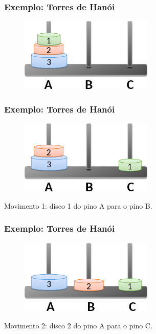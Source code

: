 \documentclass[aspectratio=169]{beamer}
\begin{document}
\begin{frame}
\frametitle{Exemplo: Torres de Hanói}

\begin{figure}[!h]
  \centering
  \includegraphics[width=180pt]{imgs/exemplo_torre_hanoi1.png}
  \label{fig_torre_hanoi2}
\end{figure}
\end{frame}


\begin{frame}
\frametitle{Exemplo: Torres de Hanói}

\begin{figure}[!h]
  \centering
  \includegraphics[width=180pt]{imgs/exemplo_torre_hanoi2.png}
  \label{fig_torre_hanoi3}
\end{figure}
Movimento 1: disco 1 do pino A para o pino B.
\end{frame}


\begin{frame}
\frametitle{Exemplo: Torres de Hanói}

\begin{figure}[!h]
  \centering
  \includegraphics[width=180pt]{imgs/exemplo_torre_hanoi3.png}
  \label{fig_torre_hanoi4}
\end{figure}
Movimento 2: disco 2 do pino A para o pino C.
\end{frame}
\end{document}
